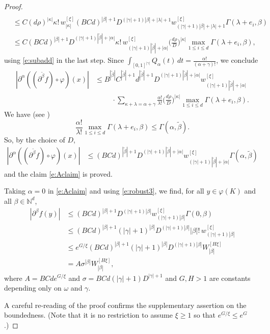 \documentclass[10pt, reqno]{amsart}
\theoremstyle{plain}
\theoremstyle{definition}
\numberwithin{equation}{section}
\def\al{\alpha}
\def\be{\beta}
\def\ga{\gamma}
\def\ka{\kappa}
\def\la{\lambda}
\def\rh{\rho}
\def\si{\sigma}
\def\vh{\varphi}
\def\om{\omega}
\def\Ga{\Gamma}
\def\N{\mathbb{N}}
\def\p{\partial}
\renewcommand{\o}{\circ}
\begin{document}
\begin{proof}
\begin{align*}
        \\  
    &\le C   (d\rh)^{|\ka|} \ka!\, w^{[\xi]}_{|\ka|} (BCd)^{|\be|+1}D^{(|\ga|+1)|\be|+ |\la|+1} w^{[\xi]}_{(|\ga|+1)|\be|+ |\la|+1} \Ga(\la+e_i,\be) 
    \\
    &\le C (BCd)^{|\be|+1}D^{(|\ga|+1)|\tilde \be|+ |\al|} \ka!\, w^{[\xi]}_{(|\ga|+1)|\tilde \be|+ |\al|}  \Big(\frac{d\rh}{D}\Big)^{|\ka|} \max_{1\le i \le d} \Ga(\la+e_i,\be),
    \end{align*}
    using \eqref{e:subadd} in the last step.
    Since $\int_{[0,1]^{|\ga|}} Q_\al(t) \, dt = \frac{\al!}{(\al+\ga)!}$, we conclude
    \begin{align*}
        |\p^\al ((\p^{\tilde \be} f) \o \vh)(x)| &\le   B^{|\tilde \be|} C^{|\tilde \be|+1} d^{|\tilde \be|+1}D^{(|\ga|+1)|\tilde \be|+ |\al|} w^{[\xi]}_{(|\ga|+1)|\tilde \be|+ |\al|}
        \\
                                                 & \hspace{1cm} \cdot \sum_{\ka+\la = \al+\ga} \frac{\al!}{\la!} \Big(\frac{d\rh}{D}\Big)^{|\ka|} \max_{1\le i \le d}  \Ga(\la+e_i,\be).
    \end{align*}
    We have (see \cite[pp. 1970--1971]{BelottoBierstoneChow17}) 
    \[
        \frac{\al!}{\la!}\max_{1\le i \le d}  \Ga(\la+e_i,\be) \le \Ga(\al,\tilde \be).
    \]
    So, by the choice of $D$,
    \begin{align*}
        |\p^\al ((\p^{\tilde \be} f) \o \vh)(x)| &\le   (B Cd)^{|\tilde \be|+1}D^{(|\ga|+1)|\tilde \be|+ |\al|} w^{[\xi]}_{(|\ga|+1)|\tilde \be|+ |\al|}\Ga(\al,\tilde \be)
    \end{align*}
    and the claim \eqref{e:Aclaim} is proved.

    Taking $\al = 0$ in \eqref{e:Aclaim} and using \eqref{e:robust3}, we find, for all $y \in \vh(K)$ and all $\be \in \N^d$, 
    \begin{align*}
        |\p^\be f(y)| &\le   (BCd)^{|\be|+1} D^{(|\ga|+1)|\be|} w^{[\xi]}_{(|\ga|+1)|\be|} \Ga(0,\be) 
        \\
                      &\le (BCd)^{|\be|+1}(|\ga|+1)^{|\be|} D^{(|\ga|+1)|\be|} |\be|!\, w^{[\xi]}_{(|\ga|+1)|\be|}
                      \\
                      &\le  e^{G/\xi} (BCd)^{|\be|+1}(|\ga|+1)^{|\be|} D^{(|\ga|+1)|\be|}  W^{[H\xi]}_{|\be|}
                      \\
                      &= A \si^{|\be|} W^{[H\xi]}_{|\be|},
    \end{align*}
    where $A= BCde^{G/\xi}$ and $\si = BCd(|\ga|+1) D^{|\ga|+1}$ and 
    $G,H > 1$ are constants depending only on $\om$ and $\ga$.

    A careful re-reading of the proof confirms the supplementary assertion on the boundedness.
    (Note that it is no restriction to assume $\xi\ge 1$ so that $e^{G/\xi} \le e^G$.)
\end{proof}
\end{document}
